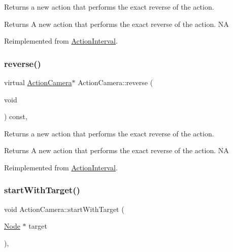 Returns a new action that performs the exact reverse of the action.

\begin{DoxyReturn}{Returns}
A new action that performs the exact reverse of the action.  NA 
\end{DoxyReturn}


Reimplemented from \hyperlink{classActionInterval_a9f9ac7164036a0bc261a72f62a2b2da7}{Action\+Interval}.

\mbox{\label{classActionCamera_a3b5503c04db52eab56d69f5ef331e976}} 
\subsubsection{\texorpdfstring{reverse()}{reverse()}\hspace{0.1cm}{\footnotesize\ttfamily [2/2]}}
{\footnotesize\ttfamily virtual \hyperlink{classActionCamera}{Action\+Camera}$\ast$ Action\+Camera\+::reverse (\begin{DoxyParamCaption}\item[{void}]{ }\end{DoxyParamCaption}) const\hspace{0.3cm}{\ttfamily [override]}, {\ttfamily [virtual]}}

Returns a new action that performs the exact reverse of the action.

\begin{DoxyReturn}{Returns}
A new action that performs the exact reverse of the action.  NA 
\end{DoxyReturn}


Reimplemented from \hyperlink{classActionInterval_a9f9ac7164036a0bc261a72f62a2b2da7}{Action\+Interval}.

\mbox{\label{classActionCamera_ab523607be45f90017decf4c5e493c733}} 
\subsubsection{\texorpdfstring{start\+With\+Target()}{startWithTarget()}\hspace{0.1cm}{\footnotesize\ttfamily [1/2]}}
{\footnotesize\ttfamily void Action\+Camera\+::start\+With\+Target (\begin{DoxyParamCaption}\item[{\hyperlink{classNode}{Node} $\ast$}]{target }\end{DoxyParamCaption})\hspace{0.3cm}{\ttfamily [override]}, {\ttfamily [virtual]}}

